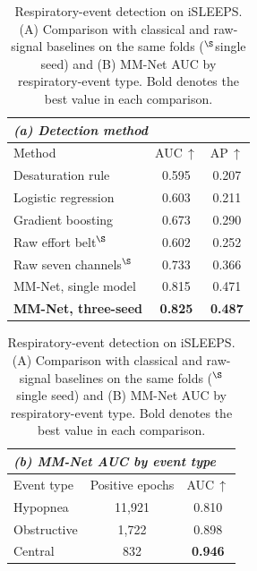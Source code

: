 \documentclass[a4paper,fleqn]{cas-sc}
\begin{document}
\begin{table}[H]
\caption{Respiratory-event detection on iSLEEPS. (A) Comparison with classical and raw-signal baselines on the same folds ($^{\S}$single seed) and (B) MM-Net AUC by respiratory-event type. Bold denotes the best value in each comparison.}
\label{tab:resp}
\centering
\small
\begin{tabular}{lcc}
\toprule
\multicolumn{3}{l}{\textit{(a) Detection method}}\\
\midrule
Method & AUC\,$\uparrow$ & AP\,$\uparrow$ \\
\midrule
Desaturation rule    & 0.595 & 0.207 \\
Logistic regression  & 0.603 & 0.211 \\
Gradient boosting    & 0.673 & 0.290 \\
Raw effort belt$^{\S}$~\cite{nassi2022effortbelt} & 0.602 & 0.252 \\
Raw seven channels$^{\S}$ & 0.733 & 0.366 \\
MM-Net, single model & 0.815 & 0.471 \\
\textbf{MM-Net, three-seed} & \textbf{0.825} & \textbf{0.487} \\
\bottomrule
\end{tabular}

\vspace{4pt}
\begin{tabular}{lcc}
\toprule
\multicolumn{3}{l}{\textit{(b) MM-Net AUC by event type}}\\
\midrule
Event type & Positive epochs & AUC\,$\uparrow$ \\
\midrule
Hypopnea    & 11{,}921 & 0.810 \\
Obstructive & 1{,}722  & 0.898 \\
Central     & 832      & \textbf{0.946} \\
\bottomrule
\end{tabular}
\end{table}
\end{document}
